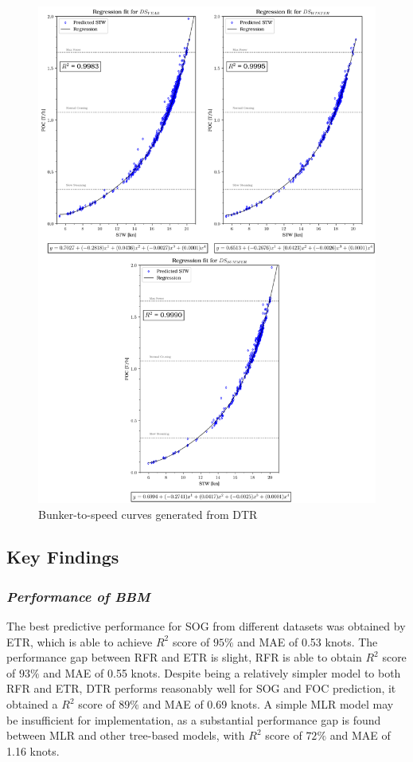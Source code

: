\begin{figure}[h!]
    \centering
    \includegraphics[width=.9\linewidth]{02_figures/poly_dtr_combi.png}
    \caption{Bunker-to-speed curves generated from DTR}
    \label{fig:FOC_plot_dtr_combi}
\end{figure}
\newpage

\subsection{Key Findings}\label{sec:key_findings}

\subsubsection*{\emph{Performance of BBM}}

The best predictive performance for SOG from different datasets was obtained by ETR, which is able to achieve $R^2$ score of $95\%$ and MAE of 0.53 knots. The performance gap between RFR and ETR is slight, RFR is able to obtain $R^2$ score of $93\%$ and MAE of 0.55 knots. Despite being a relatively simpler model to both RFR and ETR, DTR performs reasonably well for SOG and FOC prediction, it obtained a $R^2$ score of $89\%$ and MAE of 0.69 knots. A simple MLR model may be insufficient for implementation, as a substantial performance gap is found between MLR and other tree-based models, with $R^2$ score of $72\%$ and MAE of 1.16 knots.\\

